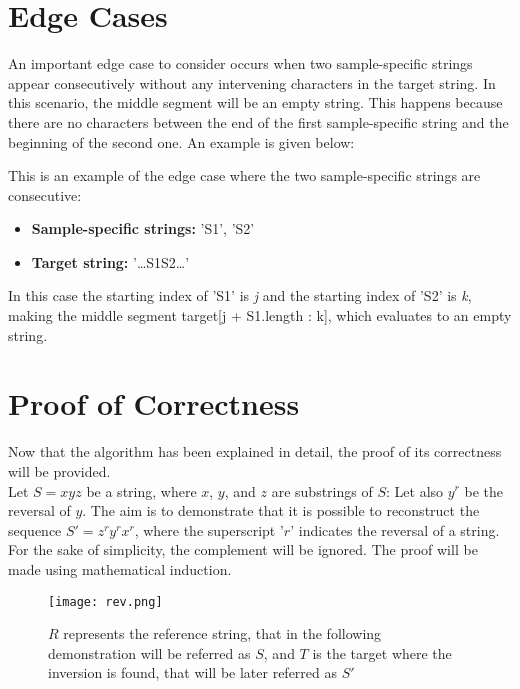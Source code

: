 \section{Edge Cases}
An important edge case to consider occurs when two sample-specific strings appear consecutively without any intervening characters in the target string. In this scenario, the middle segment will be an empty string. This happens because there are no characters between the end of the first sample-specific string and the beginning of the second one. An example is given below:

\begin{example}
  This is an example of the edge case where the two sample-specific strings are consecutive:
\begin{itemize}
    \item \textbf{Sample-specific strings: } 'S1', 'S2'
    \item \textbf{Target string: }  '\dots S1S2\dots'
\end{itemize}
\end{example}


In this case the starting index of 'S1' is \textit{j} and the starting index of 'S2' is \textit{k}, making the middle segment target[j + S1.length : k], which evaluates to an empty string.

\section{Proof of Correctness}

Now that the algorithm has been explained in detail, the proof of its correctness will be provided. \\
Let \( S = xyz \) be a string, where \( x \), \( y \), and \( z \) are substrings of \( S \): Let also \(y^r \) be the reversal of \( y \). The aim is to demonstrate that it is possible to reconstruct the sequence \( S' = z^r y^r x^r \), where the superscript '\( r \)' indicates the reversal of a string. For the sake of simplicity, the complement will be ignored. The proof will be made using mathematical induction. 

\begin{figure}[h]

  \centering
    \texttt{[image: rev.png]}

  \caption{\( R \) represents the reference string, that in the following demonstration will be referred as \( S \), and \( T \) is the target where the inversion is found, that will be later referred as \( S' \)}
  \label{fig:rev}

\end{figure}


